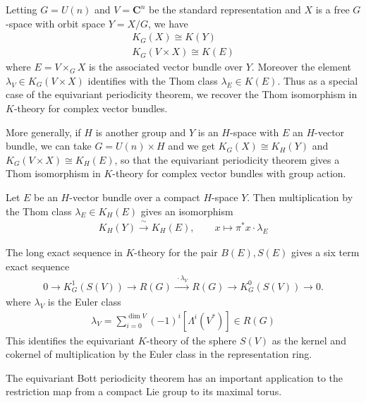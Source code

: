 \documentclass[12pt]{article}
\begin{document}
Letting $G = U(n)$ and $V = \mathbf C^n$ be the standard representation and $X$ is a free $G$-space with orbit space $Y = X/G$, we have \begin{align*}
    K_G(X) \cong K(Y) \\
    K_G(V\times X) \cong K(E)
\end{align*} where $E = V\times_G X$ is the associated vector bundle over $Y$. Moreover the element $\lambda_V \in K_G(V\times X)$ identifies with the Thom class $\lambda_E \in K(E)$. Thus as a special case of the equivariant periodicity theorem, we recover the Thom isomorphism in $K$-theory for complex vector bundles.

More generally, if $H$ is another group and $Y$ is an $H$-space with $E$ an $H$-vector bundle, we can take $G = U(n) \times H$ and we get $K_G(X) \cong K_H(Y)$ and $K_G(V\times X) \cong K_H(E)$, so that the equivariant periodicity theorem gives a Thom isomorphism in $K$-theory for complex vector bundles with group action.

\begin{theorem}
    Let $E$ be an $H$-vector bundle over a compact $H$-space $Y$. Then multiplication by the Thom class $\lambda_E \in K_H(E)$ gives an isomorphism
    \begin{align*}
        K_H(Y) \xrightarrow{\ \sim\ } K_H(E), \qquad x\longmapsto \pi^*x\cdot\lambda_E
    \end{align*}
\end{theorem}

\begin{example}
    The long exact sequence in $K$-theory for the pair $B(E),S(E)$ gives a six term exact sequence \begin{align*}
        0\longrightarrow K_G^1(S(V))
\longrightarrow R(G)
\xrightarrow{\ \cdot\lambda_{V}\ }
R(G)
\longrightarrow K_G^0(S(V))
\longrightarrow0.
    \end{align*}
    where $\lambda_V$ is the Euler class \begin{align*}
        \lambda_V = \sum_{i=0}^{\dim V}(-1)^i [\Lambda^i(V^*)] \in R(G)
    \end{align*} This identifies the equivariant $K$-theory of the sphere $S(V)$ as the kernel and cokernel of multiplication by the Euler class in the representation ring.
\end{example}

The equivariant Bott periodicity theorem has an important application to the
restriction map from a compact Lie group to its maximal torus.
\end{document}
